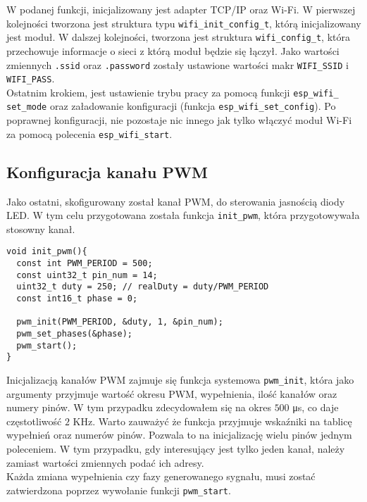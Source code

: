 W podanej funkcji, inicjalizowany jest adapter TCP/IP oraz Wi-Fi. W pierwszej kolejności
tworzona jest struktura typu \verb+wifi_init_config_t+, którą inicjalizowany jest moduł.
W dalszej kolejności, tworzona jest struktura \verb+wifi_config_t+, która przechowuje 
informacje o sieci z którą moduł będzie się łączył. Jako wartości zmiennych \verb+.ssid+ 
oraz \verb+.password+ zostały ustawione wartości makr \verb+WIFI_SSID+ i \verb+WIFI_PASS+.\\

Ostatnim krokiem, jest ustawienie trybu pracy za pomocą funkcji \verb+esp_wifi_+
\verb+set_mode+ 
oraz załadowanie konfiguracji (funkcja \verb+esp_wifi_set_config+). Po poprawnej konfiguracji,
nie pozostaje nic innego jak tylko włączyć moduł Wi-Fi za pomocą polecenia \verb+esp_wifi_start+.


\subsection{Konfiguracja kanału PWM}
\label{projekt_pwm}
Jako ostatni, skofigurowany został kanał PWM, do sterowania jasnością diody LED.
W tym celu przygotowana została funkcja \verb+init_pwm+, która przygotowywała stosowny 
kanał.\\

\begin{lstlisting}[style=customc,
    frame=single,
    caption={Konfiguracja pojedynczego kanału PWM},
    captionpos=b,
    label={projekt_pwm}]
void init_pwm(){
  const int PWM_PERIOD = 500;
  const uint32_t pin_num = 14;
  uint32_t duty = 250; // realDuty = duty/PWM_PERIOD
  const int16_t phase = 0;
   
  pwm_init(PWM_PERIOD, &duty, 1, &pin_num);
  pwm_set_phases(&phase);
  pwm_start();
}
\end{lstlisting}

Inicjalizacją kanałów PWM zajmuje się funkcja systemowa \verb+pwm_init+, która jako argumenty
przyjmuje wartość okresu PWM, wypełnienia, ilość kanałów oraz numery pinów. W tym przypadku zdecydowałem się 
na okres $\num{500}$ \si{\micro s}, co daje częstotliwość $\num{2}$ \si{KHz}.
Warto zauważyć że funkcja przyjmuje wskaźniki na tablicę wypełnień oraz numerów pinów.
Pozwala to na inicjalizację wielu pinów jednym poleceniem. W tym przypadku, gdy interesujący
jest tylko jeden kanał, należy zamiast wartości zmiennych podać ich adresy.\\

Każda zmiana wypełnienia czy fazy generowanego sygnału, musi zostać zatwierdzona
poprzez wywołanie funkcji \verb+pwm_start+.

